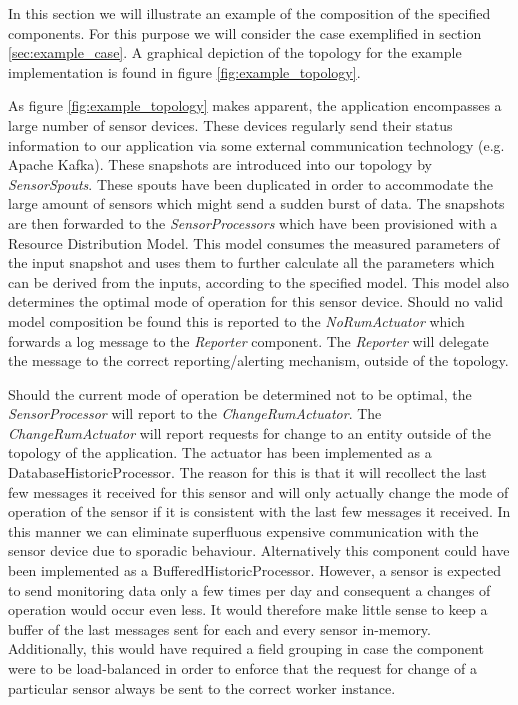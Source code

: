 In this section we will illustrate an example of the composition of the specified components. For this purpose we will consider the case exemplified in section \ref{sec:example_case}. A graphical depiction of the topology for the example implementation is found in figure \ref{fig:example_topology}. 

As figure \ref{fig:example_topology} makes apparent, the application encompasses a large number of sensor devices. These devices regularly send their status information to our application via some external communication technology (e.g. Apache Kafka). These snapshots are introduced into our topology by \emph{SensorSpouts}. These spouts have been duplicated in order to accommodate the large amount of sensors which might send a sudden burst of data. The snapshots are then forwarded to the \emph{SensorProcessors} which have been provisioned with a Resource Distribution Model. This model consumes the measured parameters of the input snapshot and uses them to further calculate all the parameters which can be derived from the inputs, according to the specified model. This model also determines the optimal mode of operation for this sensor device. Should no valid model composition be found this is reported to the \emph{NoRumActuator} which forwards a log message to the \emph{Reporter} component. The \emph{Reporter} will delegate the message to the correct reporting/alerting mechanism, outside of the topology. 

Should the current mode of operation be determined not to be optimal, the \emph{SensorProcessor} will report to the \emph{ChangeRumActuator}. The \emph{ChangeRumActuator} will report requests for change to an entity outside of the topology of the application. The actuator has been implemented as a DatabaseHistoricProcessor. The reason for this is that it will recollect the last few messages it received for this sensor and will only actually change the mode of operation of the sensor if it is consistent with the last few messages it received. In this manner we can eliminate superfluous expensive communication with the sensor device due to sporadic behaviour. Alternatively this component could have been implemented as a BufferedHistoricProcessor. However, a sensor is expected to send monitoring data only a few times per day and consequent a changes of operation would occur even less. It would therefore make little sense to keep a buffer of the last messages sent for each and every sensor in-memory. Additionally, this would have required a field grouping in case the component were to be load-balanced in order to enforce that the request for change of a particular sensor always be sent to the correct worker instance.

